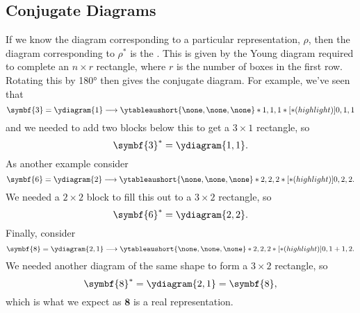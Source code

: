 \documentclass[fleqn]{NotesClass}
\newcommand{\rep}[1]{\symbf{#1}}
\begin{document}
    \subsection{Conjugate Diagrams}
    If we know the diagram corresponding to a particular representation, \(\rho\), then the diagram corresponding to \(\rho^*\) is the .
    This is given by the Young diagram required to complete an \(n \times r\) rectangle, where \(r\) is the number of boxes in the first row.
    Rotating this by \ang{180} then gives the conjugate diagram.
    For example, we've seen that
    \begin{equation}
        \rep{3} = \ydiagram{1} \longrightarrow \ytableaushort{\none,\none,\none}*{1,1,1}*[*(highlight)]{0,1,1}
    \end{equation}
    and we needed to add two blocks below this to get a \(3 \times 1\) rectangle, so
    \begin{equation}
        \rep{3}^* = \ydiagram{1,1}.
    \end{equation}
    As another example consider
    \begin{equation}
        \rep{6} = \ydiagram{2} \longrightarrow \ytableaushort{\none,\none,\none}*{2,2,2}*[*(highlight)]{0,2,2}.
    \end{equation}
    We needed a \(2 \times 2\) block to fill this out to a \(3 \times 2\) rectangle, so
    \begin{equation}
        \rep{6}^* = \ydiagram{2,2}.
    \end{equation}
    Finally, consider
    \begin{equation}
        \rep{8} = \ydiagram{2,1} \longrightarrow \ytableaushort{\none,\none,\none}*{2,2,2}*[*(highlight)]{0,1+1,2}.
    \end{equation}
    We needed another diagram of the same shape to form a \(3\times 2\) rectangle, so
    \begin{equation}
        \rep{8}^* = \ydiagram{2,1} = \rep{8},
    \end{equation}
    which is what we expect as \(\rep{8}\) is a real representation.
    
    
    
    
    
    
    
    \backmatter
    \printindex
\end{document}
